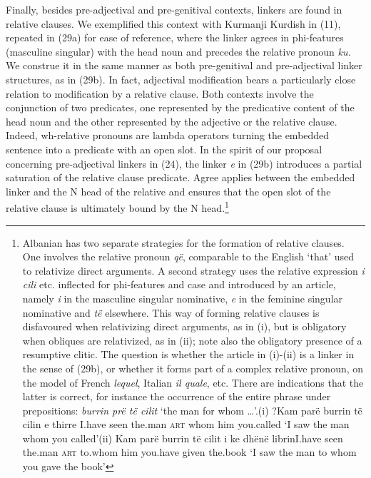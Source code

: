 \documentclass[output=paper]{langsci/langscibook}
\begin{document}
  Finally, besides pre-adjectival and pre-genitival contexts, linkers are found in relative clauses. We exemplified this context with Kurmanji Kurdish in (11), repeated in (29a) for ease of reference, where the linker agrees in phi-features (masculine singular) with the head noun and precedes the relative pronoun \textit{ku.} We construe it in the same manner as both pre-genitival and pre-adjectival linker structures, as in (29b). In fact, adjectival modification bears a particularly close relation to modification by a relative clause. Both contexts involve the conjunction of two predicates, one represented by the predicative content of the head noun and the other represented by the adjective or the relative clause. Indeed, wh-relative pronouns are lambda operators turning the embedded sentence into a predicate with an open slot. In the spirit of our proposal concerning pre-adjectival linkers in (24), the linker \textit{e} in (29b) introduces a partial saturation of the relative clause predicate. Agree applies between the embedded linker and the N head of the relative and ensures that the open slot of the relative clause is ultimately bound by the N head.\footnote{Albanian has two separate strategies for the formation of relative clauses. One involves the relative pronoun \textit{që}, comparable to the English ‘that’ used to relativize direct arguments. A second strategy uses the relative expression \textit{i} \textit{cili} etc. inflected for phi-features and case and introduced by an article, namely \textit{i} in the masculine singular nominative, \textit{e} in the feminine singular nominative and \textit{të} elsewhere. This way of forming relative clauses is disfavoured when relativizing direct arguments, as in (i), but is obligatory when obliques are relativized, as in (ii); note also the obligatory presence of a resumptive clitic. The question is whether the article in (i)-(ii) is a linker in the sense of (29b), or whether it forms part of a complex relative pronoun, on the model of French \textit{lequel}, Italian \textit{il quale}, etc. There are indications that the latter is correct, for instance the occurrence of the entire phrase under prepositions: \textit{burrin prë të cilit} ‘the man for whom …’.(i)  ?Kam  parë   burrin   të   cilin   e   thirre   I.have   seen   the.man  \textsc{art}   whom  him   you.called  ‘I saw the man whom you called’(ii)  Kam  parë   burrin   të   cilit     i   ke     dhënë   librinI.have   seen  the.man  \textsc{art}   to.whom    him   you.have   given   the.book  ‘I saw the man to whom you gave the book’}  
\end{document}
